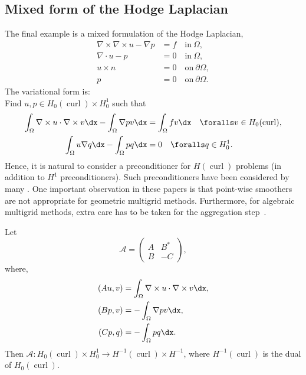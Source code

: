 \subsection{Mixed form of the Hodge Laplacian}
The final example is a mixed formulation
of the Hodge Laplacian,
\begin{align}
\nabla \times \nabla \times u - \nabla p &= f \quad \mbox{in} \ \Omega,    \label{mixed:hodge1} \\
\nabla \cdot u -p &=  0 \quad \mbox{in} \ \Omega, \label{mixed:hodge2} \\
             u \times n &= 0 \quad \mbox{on} \ \partial \Omega, \\
             p          &= 0 \quad \mbox{on} \ \partial \Omega.
\end{align}
The variational form is: \\
Find $u, p \in H_0(\operatorname{curl}) \times H^1_0$ such that
\begin{align}
\int_\Omega \nabla \times u \cdot \nabla \times v \dx
- \int_\Omega \nabla p v \dx &= \int_\Omega f v \dx  \quad \foralls v \in H_0(\operatorname{curl}), \\
 \int_\Omega u  \nabla q \dx - \int_\Omega p q \dx &= 0 \quad
 \foralls q \in H^1_0.
\end{align}
Hence, it is natural to consider a preconditioner  for
$H(\operatorname{curl})$ problems (in addition to $H^1$
preconditioners). Such preconditioners have been considered by many
\citep{ArnoldFalkWinther1997a,ArnoldFalkWinther2000,Hiptmair1997,Hiptmair1999}.
One important observation in these papers is that point-wise smoothers
are not appropriate for geometric multigrid methods. Furthermore, for
algebraic multigrid methods, extra care has to be taken for the
aggregation
step~\citep{GeeSiefertHuEtAl2006,HuTuminaroBochevEtAl2006}.

Let
\[
\mathcal{A}  =
\begin{pmatrix} A & B^* \\ B & -C \end{pmatrix},
\]
where,
\begin{align}
  (A u, v) &= \int_\Omega \nabla \times u \cdot \nabla \times v \dx, \\
  (B p, v) &=  - \int_\Omega \nabla p v \dx, \\
  (C p, q) &=  - \int_\Omega p q \dx.
\end{align}
Then $\mathcal{A}: H_0(\operatorname{curl}) \times H^1_0 \rightarrow
H^{-1}(\operatorname{curl}) \times H^{-1}$, where
$H^{-1}(\operatorname{curl})$ is the dual of
$H_0(\operatorname{curl})$.


